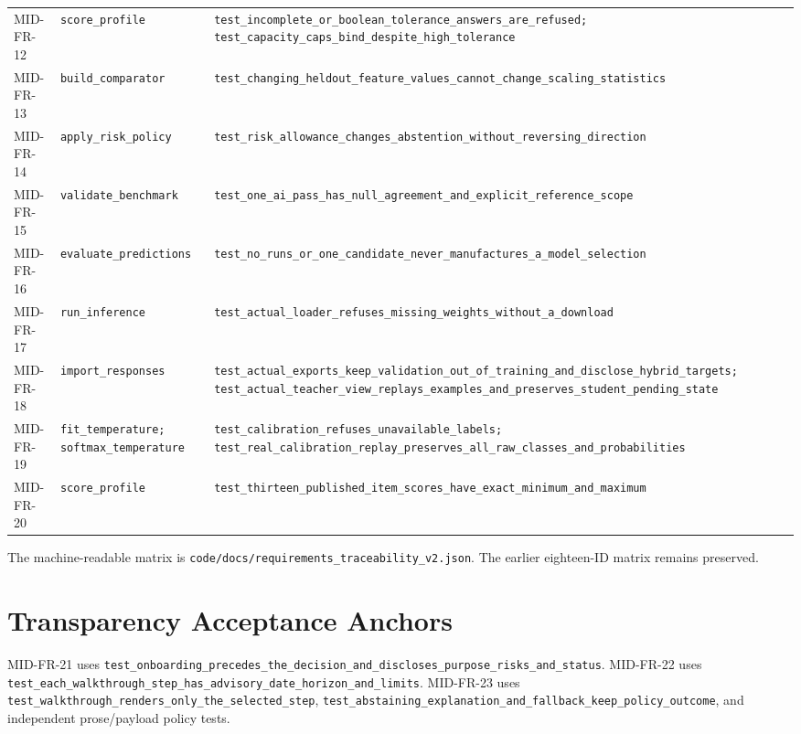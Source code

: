 \begin{longtable}{p{}p{}p{}}
MID-FR-12 & \nolinkurl{score_profile} & \nolinkurl{test_incomplete_or_boolean_tolerance_answers_are_refused; test_capacity_caps_bind_despite_high_tolerance}\\
MID-FR-13 & \nolinkurl{build_comparator} & \nolinkurl{test_changing_heldout_feature_values_cannot_change_scaling_statistics}\\
MID-FR-14 & \nolinkurl{apply_risk_policy} & \nolinkurl{test_risk_allowance_changes_abstention_without_reversing_direction}\\
MID-FR-15 & \nolinkurl{validate_benchmark} & \nolinkurl{test_one_ai_pass_has_null_agreement_and_explicit_reference_scope}\\
MID-FR-16 & \nolinkurl{evaluate_predictions} & \nolinkurl{test_no_runs_or_one_candidate_never_manufactures_a_model_selection}\\
MID-FR-17 & \nolinkurl{run_inference} & \nolinkurl{test_actual_loader_refuses_missing_weights_without_a_download}\\
MID-FR-18 & \nolinkurl{import_responses} & \nolinkurl{test_actual_exports_keep_validation_out_of_training_and_disclose_hybrid_targets; test_actual_teacher_view_replays_examples_and_preserves_student_pending_state}\\
MID-FR-19 & \nolinkurl{fit_temperature; softmax_temperature} & \nolinkurl{test_calibration_refuses_unavailable_labels; test_real_calibration_replay_preserves_all_raw_classes_and_probabilities}\\
MID-FR-20 & \nolinkurl{score_profile} & \nolinkurl{test_thirteen_published_item_scores_have_exact_minimum_and_maximum}\\
\bottomrule\end{longtable}
\endgroup
The machine-readable matrix is \nolinkurl{code/docs/requirements_traceability_v2.json}. The earlier eighteen-ID matrix remains preserved.

\section{Transparency Acceptance Anchors}
MID-FR-21 uses \nolinkurl{test_onboarding_precedes_the_decision_and_discloses_purpose_risks_and_status}. MID-FR-22 uses \nolinkurl{test_each_walkthrough_step_has_advisory_date_horizon_and_limits}. MID-FR-23 uses \nolinkurl{test_walkthrough_renders_only_the_selected_step}, \nolinkurl{test_abstaining_explanation_and_fallback_keep_policy_outcome}, and independent prose/payload policy tests.
